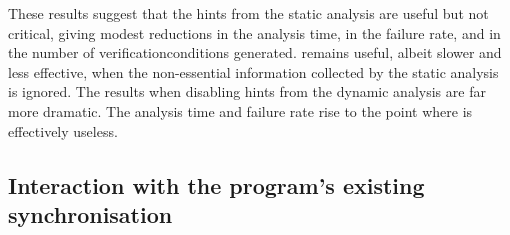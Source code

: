 These results suggest that the hints from the static analysis are
useful but not critical, giving modest reductions in the analysis
time, in the failure rate, and in the number of
\glspl{verificationcondition} generated.  {\Technique} remains useful,
albeit slower and less effective, when the non-essential information
collected by the static analysis is ignored.  The results when
disabling hints from the dynamic analysis are far more dramatic.  The
analysis time and failure rate rise to the point where {\technique} is
effectively useless.  

\subsection{Interaction with the program's existing synchronisation}

\begin{sanefig}
\end{sanefig}

